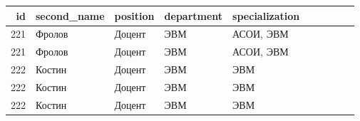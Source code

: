 \begin{tabular}{rlllllrrrr}
\toprule
id & second_name & position & department & specialization\\
\midrule
221 & Фролов & Доцент & ЭВМ & АСОИ, ЭВМ \\
221 & Фролов & Доцент & ЭВМ & АСОИ, ЭВМ \\
222 & Костин & Доцент & ЭВМ & ЭВМ \\
222 & Костин & Доцент & ЭВМ & ЭВМ \\
222 & Костин & Доцент & ЭВМ & ЭВМ \\
\bottomrule
\end{tabular}
